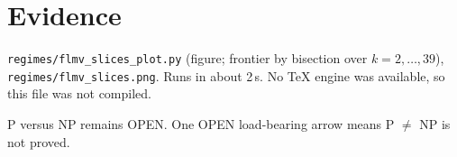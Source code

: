 \documentclass[11pt]{article}
\begin{document}
\section{Evidence}
\texttt{regimes/flmv\_slices\_plot.py} (figure; frontier by bisection over $k=2,\dots,39$), \texttt{regimes/flmv\_slices.png}. Runs in about 2\,s. No TeX engine was available, so this file was not compiled.

\medskip\noindent P versus NP remains OPEN. One OPEN load-bearing arrow means P $\ne$ NP is not proved.
\end{document}

